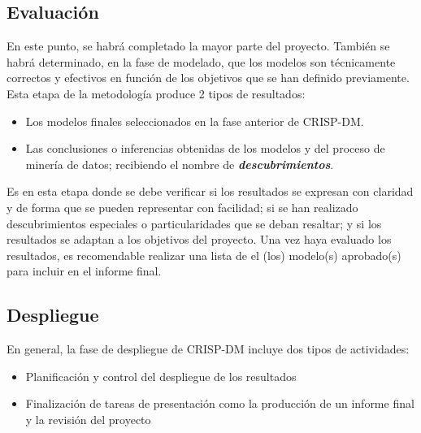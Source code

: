 

\subsection{Evaluación} 

En este punto, se habrá completado la mayor parte del proyecto. También se habrá determinado, en la fase de modelado, que los modelos son técnicamente correctos y efectivos en función de los objetivos que se han definido previamente. Esta etapa de la metodología produce 2 tipos de resultados: \begin{itemize}
    \item Los modelos finales seleccionados en la fase anterior de CRISP-DM.
    \item Las conclusiones o inferencias obtenidas de los modelos y del proceso de minería de datos; recibiendo el nombre de \textit{\textbf{descubrimientos}}.
\end{itemize}

Es en esta etapa donde se debe verificar si los resultados se expresan con claridad y de forma que se pueden representar con facilidad; si se han realizado descubrimientos especiales o particularidades que se deban resaltar; y si los resultados se adaptan a los objetivos del proyecto. Una vez haya evaluado los resultados, es recomendable realizar una lista de el (los) modelo(s) aprobado(s) para incluir en el informe final.


\subsection{Despliegue} 
En general, la fase de despliegue de CRISP-DM incluye dos tipos de actividades:
\begin{itemize}
    \item Planificación y control del despliegue de los resultados
    \item Finalización de tareas de presentación como la producción de un informe final y la revisión del proyecto
\end{itemize}
